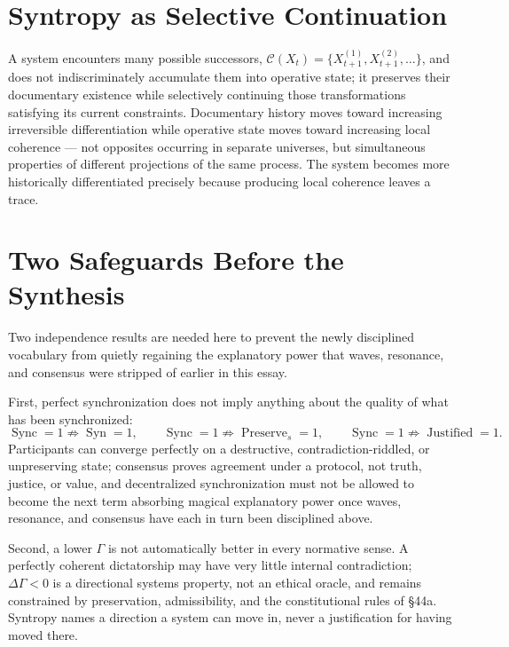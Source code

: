 \documentclass[12pt]{article}
\begin{document}
\section{Syntropy as Selective Continuation}

A system encounters many possible successors, $\mathcal{C}(X_t)=\{X_{t+1}^{(1)},X_{t+1}^{(2)},\dots\}$, and does not indiscriminately accumulate them into operative state; it preserves their documentary existence while selectively continuing those transformations satisfying its current constraints. Documentary history moves toward increasing irreversible differentiation while operative state moves toward increasing local coherence — not opposites occurring in separate universes, but simultaneous properties of different projections of the same process. The system becomes more historically differentiated precisely because producing local coherence leaves a trace.

\section{Two Safeguards Before the Synthesis}

Two independence results are needed here to prevent the newly disciplined vocabulary from quietly regaining the explanatory power that waves, resonance, and consensus were stripped of earlier in this essay.

First, perfect synchronization does not imply anything about the quality of what has been synchronized:
\[
\operatorname{Sync}=1\not\Rightarrow\operatorname{Syn}=1,\qquad
\operatorname{Sync}=1\not\Rightarrow\operatorname{Preserve}_s=1,\qquad
\operatorname{Sync}=1\not\Rightarrow\operatorname{Justified}=1.
\]
Participants can converge perfectly on a destructive, contradiction-riddled, or unpreserving state; consensus proves agreement under a protocol, not truth, justice, or value, and decentralized synchronization must not be allowed to become the next term absorbing magical explanatory power once waves, resonance, and consensus have each in turn been disciplined above.

Second, a lower $\Gamma$ is not automatically better in every normative sense. A perfectly coherent dictatorship may have very little internal contradiction; $\Delta\Gamma<0$ is a directional systems property, not an ethical oracle, and remains constrained by preservation, admissibility, and the constitutional rules of \S44a. Syntropy names a direction a system can move in, never a justification for having moved there.
\end{document}
